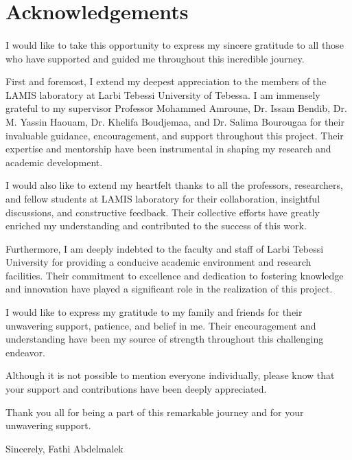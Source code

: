 \section*{Acknowledgements}
\paragraph{}
I would like to take this opportunity to express my sincere gratitude to all those who have supported and guided me throughout this incredible journey.

First and foremost, I extend my deepest appreciation to the members of the LAMIS laboratory at Larbi Tebessi University of Tebessa. I am immensely grateful to my supervisor Professor Mohammed Amroune, Dr. Issam Bendib, Dr. M. Yassin Haouam, Dr. Khelifa Boudjemaa, and Dr. Salima Bourougaa for their invaluable guidance, encouragement, and support throughout this project. Their expertise and mentorship have been instrumental in shaping my research and academic development.

I would also like to extend my heartfelt thanks to all the professors, researchers, and fellow students at LAMIS laboratory for their collaboration, insightful discussions, and constructive feedback. Their collective efforts have greatly enriched my understanding and contributed to the success of this work.

Furthermore, I am deeply indebted to the faculty and staff of Larbi Tebessi University for providing a conducive academic environment and research facilities. Their commitment to excellence and dedication to fostering knowledge and innovation have played a significant role in the realization of this project.

I would like to express my gratitude to my family and friends for their unwavering support, patience, and belief in me. Their encouragement and understanding have been my source of strength throughout this challenging endeavor.

Although it is not possible to mention everyone individually, please know that your support and contributions have been deeply appreciated.

Thank you all for being a part of this remarkable journey and for your unwavering support.

Sincerely,
Fathi Abdelmalek
